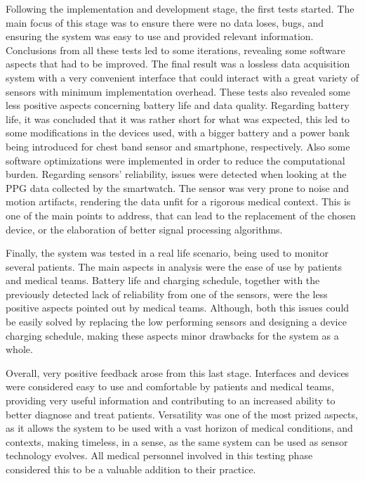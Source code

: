 Following the implementation and development stage, the first tests started. The main focus of this stage was to ensure there were no data loses, bugs, and ensuring the system was easy to use and provided relevant information. Conclusions from all these tests led to some iterations, revealing some software aspects that had to be improved. The final result was a lossless data acquisition system with a very convenient interface that could interact with a great variety of sensors with minimum implementation overhead. These tests also revealed some less positive aspects concerning battery life and data quality. Regarding battery life, it was concluded that it was rather short for what was expected, this led to some modifications in the devices used, with a bigger battery and a power bank being introduced for chest band sensor and smartphone, respectively. Also some software optimizations were implemented in order to reduce the computational burden. Regarding sensors' reliability, issues were detected when looking at the PPG data collected by the smartwatch. The sensor was very prone to noise and motion artifacts, rendering the data unfit for a rigorous medical context. This is one of the main points to address, that can lead to the replacement of the chosen device, or the elaboration of better signal processing algorithms.

Finally, the system was tested in a real life scenario, being used to monitor several patients. The main aspects in analysis were the ease of use by patients and medical teams. Battery life and charging schedule, together with the previously detected lack of reliability from one of the sensors, were the less positive aspects pointed out by medical teams. Although, both this issues could be easily solved by replacing the low performing sensors and designing a device charging schedule, making these aspects minor drawbacks for the system as a whole.

Overall, very positive feedback arose from this last stage. Interfaces and devices were considered easy to use and comfortable by patients and medical teams, providing very useful information and contributing to an increased ability to better diagnose and treat patients. Versatility was one of the most prized aspects, as it allows the system to be used with a vast horizon of medical conditions, and contexts, making timeless, in a sense, as the same system can be used as sensor technology evolves. All medical personnel involved in this testing phase considered this to be a valuable addition to their practice.

